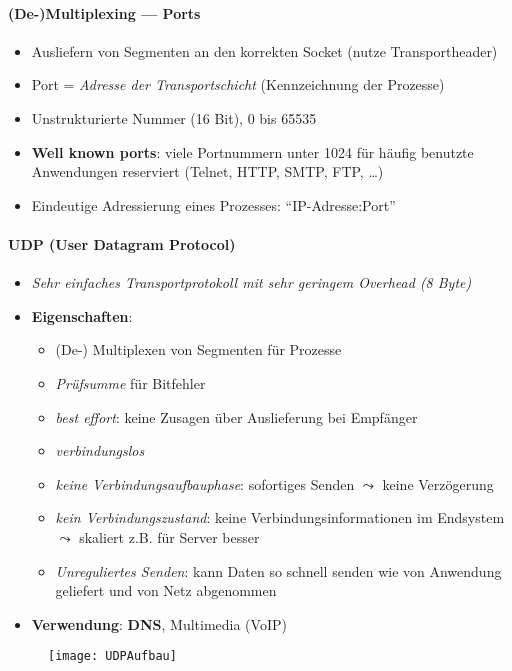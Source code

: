 \paragraph{(De-)Multiplexing --- Ports}
\begin{itemize}
\item Ausliefern von Segmenten an den korrekten Socket (nutze Transportheader)
  \item Port = \emph{Adresse der Transportschicht} (Kennzeichnung der Prozesse)
  \item Unstrukturierte Nummer (16 Bit), 0 bis 65535
  \item \textbf{Well known ports}: viele Portnummern unter 1024 für häufig benutzte Anwendungen reserviert (Telnet, HTTP, SMTP, FTP, \dots)
  \item Eindeutige Adressierung eines Prozesses: ``IP-Adresse:Port''
\end{itemize}

\paragraph{UDP (User Datagram Protocol)}
\begin{itemize}
  \item \emph{Sehr einfaches Transportprotokoll mit sehr geringem Overhead (8 Byte)}
  \item \textbf{Eigenschaften}:
  \begin{itemize}
    \item (De-) Multiplexen von Segmenten für Prozesse
    \item \emph{Prüfsumme} für Bitfehler
    \item \emph{best effort}: keine Zusagen über Auslieferung bei Empfänger
    \item \emph{verbindungslos}
    \item \emph{keine Verbindungsaufbauphase}: sofortiges Senden \( \leadsto \) keine Verzögerung
    \item \emph{kein Verbindungszustand}: keine Verbindungsinformationen im Endsystem \( \leadsto \) skaliert z.B. für Server besser
    \item \emph{Unreguliertes Senden}: kann Daten so schnell senden wie von Anwendung geliefert und von Netz abgenommen
  \end{itemize}
  \item \textbf{Verwendung}: \textbf{DNS}, Multimedia (VoIP)
\end{itemize}
\begin{figure}[H]\centering\label{UDPAufbau}\texttt{[image: UDPAufbau]}\end{figure}

